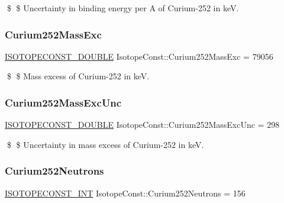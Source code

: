 \$ \$ Uncertainty in binding energy per A of Curium-\/252 in keV. \mbox{\label{group___isotope_const-_curium-_cm252_gacbb79efde654bc41cab6d52896812c77}} 
\subsubsection{\texorpdfstring{Curium252\+Mass\+Exc}{Curium252MassExc}}
{\footnotesize\ttfamily \mbox{\hyperlink{group___isotope_const-_macros_ga8f45a7272ce02c0b4c65c44636ed719a}{I\+S\+O\+T\+O\+P\+E\+C\+O\+N\+S\+T\+\_\+\+D\+O\+U\+B\+LE}} Isotope\+Const\+::\+Curium252\+Mass\+Exc = 79056}

\$ \$ Mass excess of Curium-\/252 in keV. \mbox{\label{group___isotope_const-_curium-_cm252_gadacec3e8e8915a1b3ec148b2d5f7cdc2}} 
\subsubsection{\texorpdfstring{Curium252\+Mass\+Exc\+Unc}{Curium252MassExcUnc}}
{\footnotesize\ttfamily \mbox{\hyperlink{group___isotope_const-_macros_ga8f45a7272ce02c0b4c65c44636ed719a}{I\+S\+O\+T\+O\+P\+E\+C\+O\+N\+S\+T\+\_\+\+D\+O\+U\+B\+LE}} Isotope\+Const\+::\+Curium252\+Mass\+Exc\+Unc = 298}

\$ \$ Uncertainty in mass excess of Curium-\/252 in keV. \mbox{\label{group___isotope_const-_curium-_cm252_gaa6aa02185192dfccb248d275fdcb13ee}} 
\subsubsection{\texorpdfstring{Curium252\+Neutrons}{Curium252Neutrons}}
{\footnotesize\ttfamily \mbox{\hyperlink{group___isotope_const-_macros_ga5f18360b3e99483a35c32d789e62621c}{I\+S\+O\+T\+O\+P\+E\+C\+O\+N\+S\+T\+\_\+\+I\+NT}} Isotope\+Const\+::\+Curium252\+Neutrons = 156}

